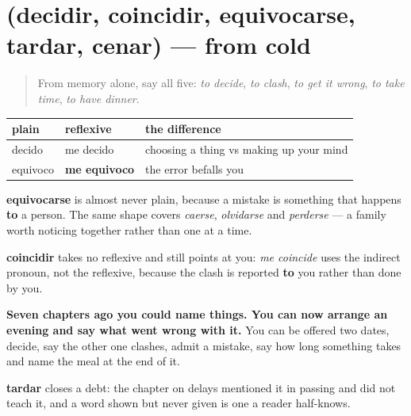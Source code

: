 \section[(decidir, coincidir, equivocarse …]{(decidir, coincidir, equivocarse, tardar, cenar) — from cold}

\label{lesson:ES-R437-repaso-planes}



\begin{quote}
From memory alone, say all five: \emph{to decide}, \emph{to clash}, \emph{to get it wrong}, \emph{to take time}, \emph{to have dinner}.
\end{quote}

\begin{grammarlens}[title={Grammar Lens: the reflexive marks what happens to you}]
\noindent
\begin{tabularx}{\linewidth}{@{}>{\raggedright\arraybackslash}X>{\raggedright\arraybackslash}X>{\raggedright\arraybackslash}X@{}}
\toprule
\textbf{plain} & \textbf{reflexive} & \textbf{the difference} \\
\midrule
decido & me decido & choosing a thing vs making up your mind \\
equivoco & \textbf{me equivoco} & the error befalls you \\
\bottomrule
\end{tabularx}

\textbf{equivocarse} is almost never plain, because a mistake is something that happens \textbf{to} a person. The same shape covers \emph{caerse}, \emph{olvidarse} and \emph{perderse} — a family worth noticing together rather than one at a time.

\textbf{coincidir} takes no reflexive and still points at you: \emph{me coincide} uses the indirect pronoun, not the reflexive, because the clash is reported \textbf{to} you rather than done by you.
\end{grammarlens}

\begin{grammarlens}[title={What you've built}]
\textbf{Seven chapters ago you could name things. You can now arrange an evening and say what went wrong with it.} You can be offered two dates, decide, say the other one clashes, admit a mistake, say how long something takes and name the meal at the end of it.

\textbf{tardar} closes a debt: the chapter on delays mentioned it in passing and did not teach it, and a word shown but never given is one a reader half-knows.
\end{grammarlens}

